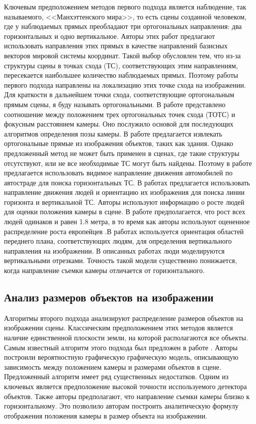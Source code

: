 Ключевым предположением методов первого подхода является наблюдение, так называемого, <<Манхэттенского мира>>, то есть сцены созданной человеком, где у наблюдаемых прямых преобладают три ортогональных направления: два горизонтальных и одно вертикальное. Авторы этих работ предлагают использовать направления этих прямых в качестве направлений базисных векторов мировой системы координат. Такой выбор обусловлен тем, что из-за структуры сцены в точках схода (ТС), соответствующих этим направлениям, пересекается наибольшее количество наблюдаемых прямых. Поэтому работы первого подхода направлены на локализацию этих точке схода на изображении. Для краткости в дальнейшем точки схода, соответствующие ортогональным прямым сцены, я буду называть ортогональными. В работе \cite{caprile1990using} представлено соотношение между положением трех ортогональных точек схода (ТОТС) и фокусным расстоянием камеры. Оно послужило основой для последующих алгоритмов определения позы камеры. В работе \cite{li2010simultaneous} предлагается извлекать ортогональные прямые из изображения объектов, таких как здания. Однако предложенный метод не может быть применен в сценах, где такие структуры отсутствуют, или не все необходимые ТС могут быть найдены. Поэтому в работе \cite{dubska2014automatic} предлагается использовать видимое направление движения автомобилей по автостраде для поиска горизонтальных ТС. В работах \cite{chen2007accurate,liu2011surveillance,den2015automatic} предлагается использовать направление движения людей и ориентацию их изображения для поиска линии горизонта и вертикальной ТС. Авторы используют информацию о росте людей для оценки положения камеры в сцене. В работе \cite{den2015automatic} предполагается, что рост всех людей одинаков и равен 1.8 метра, в то время как авторы \cite{liu2011surveillance} используют оцененное распределение роста европейцев \cite{visscher2008sizing}.В работах \cite{chen2007accurate,liu2011surveillance} используется ориентация областей переднего плана, соответствующих людям, для определения вертикального направления на изображении. В описанных работах люди моделируются вертикальными отрезками. Точность такой модели существенно понижается, когда направление съемки камеры отличается от горизонтального.

\subsection{Анализ размеров объектов на изображении}

Алгоритмы второго подхода анализируют распределение размеров объектов на изображении сцены. Классическим предположением этих методов является наличие единственной плоскости земли, на которой располагаются все объекты. Самым известный алгоритм этого подхода был предложен в работе \cite{hoiem2008putting}. Авторы построили вероятностную графическую графическую модель, описывающую зависимость между положением камеры и размерами объектов в сцене. Предложенный алгоритм имеет ряд существенных недостатков. Одним из ключевых является предположение высокой точности исспользуемого детектора объектов. Также авторы предполагают, что направление съемки камеры близко к горизонтальному. Это позволило авторам построить аналитическую формулу отображения положения камеры в размер объекта на изображении.

